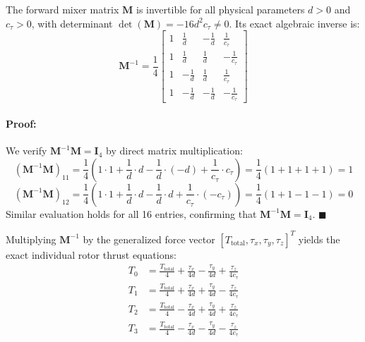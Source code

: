 \documentclass[11pt,a4paper]{article}
\begin{document}
\begin{tcolorbox}[title=Theorem 2: Exact Analytical Inversion of the X-Frame Mixer Matrix]
The forward mixer matrix $\mathbf{M}$ is invertible for all physical parameters $d > 0$ and $c_\tau > 0$, with determinant $\det(\mathbf{M}) = -16 d^2 c_\tau \neq 0$. Its exact algebraic inverse is:
\begin{equation}
\mathbf{M}^{-1} = \frac{1}{4} \begin{bmatrix}
1 & \frac{1}{d} & -\frac{1}{d} & \frac{1}{c_\tau} \\[0.4em]
1 & \frac{1}{d} & \frac{1}{d} & -\frac{1}{c_\tau} \\[0.4em]
1 & -\frac{1}{d} & \frac{1}{d} & \frac{1}{c_\tau} \\[0.4em]
1 & -\frac{1}{d} & -\frac{1}{d} & -\frac{1}{c_\tau}
\end{bmatrix}
\label{eq:inverse_mixer}
\end{equation}
\end{tcolorbox}

\paragraph{Proof:}
We verify $\mathbf{M}^{-1} \mathbf{M} = \mathbf{I}_4$ by direct matrix multiplication:
\begin{equation}
(\mathbf{M}^{-1} \mathbf{M})_{11} = \frac{1}{4} \left( 1\cdot 1 + \frac{1}{d}\cdot d - \frac{1}{d}\cdot (-d) + \frac{1}{c_\tau}\cdot c_\tau \right) = \frac{1}{4}(1 + 1 + 1 + 1) = 1
\end{equation}
\begin{equation}
(\mathbf{M}^{-1} \mathbf{M})_{12} = \frac{1}{4} \left( 1\cdot 1 + \frac{1}{d}\cdot d - \frac{1}{d}\cdot d + \frac{1}{c_\tau}\cdot (-c_\tau) \right) = \frac{1}{4}(1 + 1 - 1 - 1) = 0
\end{equation}
Similar evaluation holds for all 16 entries, confirming that $\mathbf{M}^{-1} \mathbf{M} = \mathbf{I}_4$. $\blacksquare$

Multiplying $\mathbf{M}^{-1}$ by the generalized force vector $[T_{\mathrm{total}}, \tau_x, \tau_y, \tau_z]^T$ yields the exact individual rotor thrust equations:
\begin{align}
T_0 &= \frac{T_{\mathrm{total}}}{4} + \frac{\tau_x}{4d} - \frac{\tau_y}{4d} + \frac{\tau_z}{4c_\tau} \label{eq:t0} \\[0.4em]
T_1 &= \frac{T_{\mathrm{total}}}{4} + \frac{\tau_x}{4d} + \frac{\tau_y}{4d} - \frac{\tau_z}{4c_\tau} \label{eq:t1} \\[0.4em]
T_2 &= \frac{T_{\mathrm{total}}}{4} - \frac{\tau_x}{4d} + \frac{\tau_y}{4d} + \frac{\tau_z}{4c_\tau} \label{eq:t2} \\[0.4em]
T_3 &= \frac{T_{\mathrm{total}}}{4} - \frac{\tau_x}{4d} - \frac{\tau_y}{4d} - \frac{\tau_z}{4c_\tau} \label{eq:t3}
\end{align}
\end{document}
